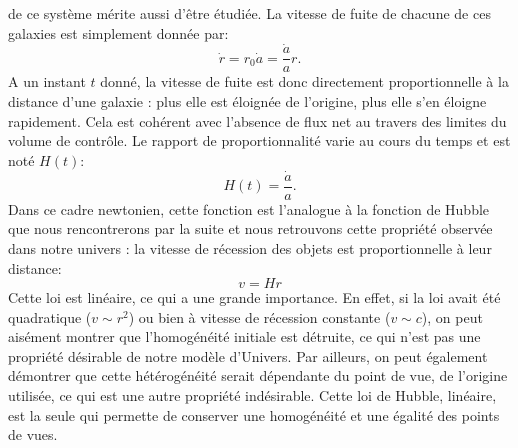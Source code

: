  de ce système mérite aussi d'être étudiée. La vitesse de fuite de chacune de ces galaxies est simplement donnée par:
\begin{equation}
\dot r= r_0 \dot a = \frac{\dot a}{a} r.
\end{equation}
A un instant $t$ donné, la vitesse de fuite est donc directement proportionnelle à la distance d'une galaxie : plus elle est éloignée de l'origine, plus elle s'en éloigne rapidement. Cela est cohérent avec l'absence de flux net au travers des limites du volume de contrôle. Le rapport de proportionnalité varie au cours du temps et est noté $H(t)$:
\begin{equation}
H(t)=\frac{\dot a}{a}.
\end{equation}
Dans ce cadre newtonien, cette fonction est l'analogue à la fonction de Hubble  que nous rencontrerons par la suite et nous retrouvons cette propriété observée dans notre univers : la vitesse de récession des objets est proportionnelle à leur distance:
\begin{equation}
v=Hr
\label{e:hubblenewt}
\end{equation}
Cette loi est linéaire, ce qui a une grande importance. En effet, si la loi avait été quadratique ($v\sim r^2$) ou bien à vitesse de récession constante ($v\sim c$), on peut aisément montrer que l'homogénéité initiale est détruite, ce qui n'est pas une propriété désirable de notre modèle d'Univers. Par ailleurs, on peut également démontrer que cette hétérogénéité serait dépendante du point de vue, de l'origine utilisée, ce qui est une autre propriété indésirable. Cette loi de Hubble, linéaire, est la seule qui permette de conserver une homogénéité et une égalité des points de vues.

